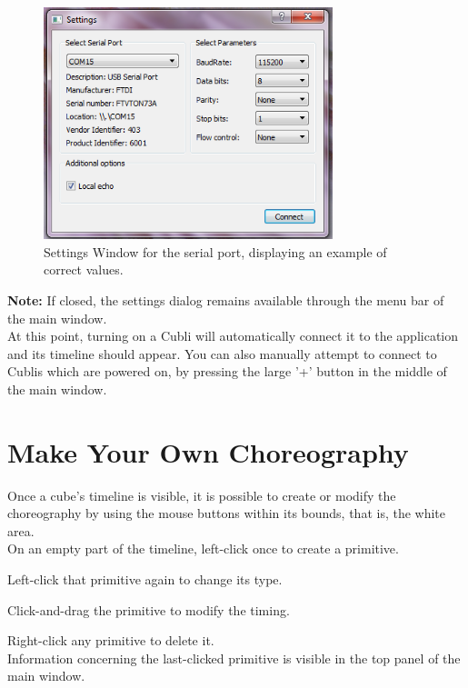 \begin{figure}[ht]
   \centering
   \includegraphics[width=0.75\textwidth]{img/SerialSettings.png}
   \caption{Settings Window for the serial port, displaying an example of correct values.}
   \label{img:SerialSettings}
\end{figure}

\textbf{Note:} If closed, the settings dialog remains available through the menu bar of the main window.\\

At this point, turning on a Cubli will automatically connect it to the application and its timeline should appear. You can also manually attempt to connect to Cublis which are powered on, by pressing the large '+' button in the middle of the main window.


\section{Make Your Own Choreography}

Once a cube's timeline is visible, it is possible to create or modify the choreography by using the mouse buttons within its bounds, that is, the white area.\\

On an empty part of the timeline, left-click once to create a primitive.

Left-click that primitive again to change its type.

Click-and-drag the primitive to modify the timing.

Right-click any primitive to delete it.\\

Information concerning the last-clicked primitive is visible in the top panel of the main window.\\

